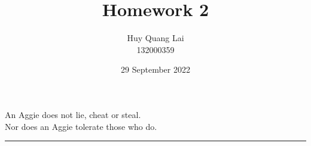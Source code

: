 \documentclass[fleqn,12pt]{article}
\title{\vspace{-2.5cm}Homework 2}
\author{\vspace{-0.2cm} Huy Quang Lai\\132000359}
\affil{Texas A\&M University}
\date{\vspace{-0.5cm}29 September 2022}
\begin{document}
\maketitle
\begin{center}
{\large
An Aggie does not lie, cheat or steal.\\
Nor does an Aggie tolerate those who do.
}
\rule{\textwidth}{.1pt}
\end{center}


\end{document}
